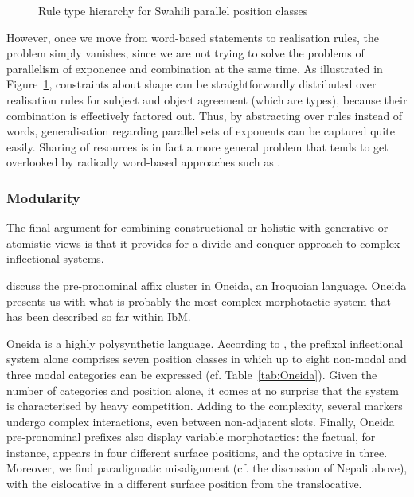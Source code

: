 \documentclass[output=paper
	        ,collection
	        ,collectionchapter
 	        ,biblatex
                ,babelshorthands
                ,newtxmath
                ,draftmode
                ,colorlinks, citecolor=brown
]{langscibook}
\begin{document}
\begin{exe}
\begin{xlist}
\begin{exe}
\begin{xlist}
\begin{figure}[htb]
  \caption{Rule type hierarchy for Swahili parallel position classes \citep{Crysmann:Bonami:2016}}
  \label{fig:Swahili}
\end{figure}

However, once we move from word-based statements to realisation rules,
the problem simply vanishes, since we are not trying to solve the
problems of parallelism of exponence and combination at the same time.
As illustrated in Figure~\ref{fig:Swahili}, constraints about shape
can be straightforwardly distributed over realisation rules for
subject and object agreement (which are types), because their
combination is effectively factored out. Thus, by abstracting over
rules instead of words, generalisation regarding parallel sets of
exponents can be captured quite easily. Sharing of resources is in
fact a more general problem that tends to get overlooked by radically
word-based approaches such as \citet{Blevins14}.

\subsubsection{Modularity}

The final argument for combining constructional or holistic with
generative or atomistic views is that it provides for a divide and
conquer approach to complex inflectional systems.

\citet{diaz:koenig:michelson:19} discuss the pre-pronominal affix
cluster in Oneida, an Iroquoian language. Oneida presents us with what
is probably the most complex morphotactic system that has been
described so far within IbM.

Oneida is a highly polysynthetic language. According to
\citet{diaz:koenig:michelson:19}, the prefixal inflectional system alone
comprises seven  position classes in which up to eight
non-modal and three modal categories can be expressed
(cf. Table~\ref{tab:Oneida}). Given the number of categories and
position alone, it comes at no surprise that the system is
characterised by heavy competition. Adding to the complexity, several
markers undergo complex interactions, even between non-adjacent slots.
Finally, Oneida pre-pronominal prefixes also display variable
morphotactics: the factual, for instance, appears in four different surface
positions, and the optative in three. Moreover, we find paradigmatic
misalignment (cf. the discussion of Nepali above), with the
cislocative in a different surface position from the translocative.


\end{xlist}
\end{exe}
\end{xlist}
\end{exe}
\end{document}
